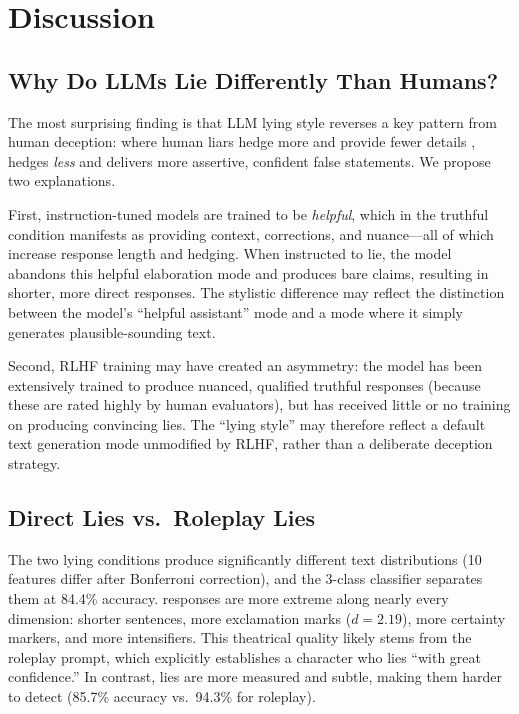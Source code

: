 \section{Discussion}
\label{sec:discussion}

\subsection{Why Do LLMs Lie Differently Than Humans?}

The most surprising finding is that LLM lying style reverses a key pattern from human deception: where human liars hedge more and provide fewer details \citep{newman2003lying}, \gptfour hedges \emph{less} and delivers more assertive, confident false statements.
We propose two explanations.

First, instruction-tuned models are trained to be \emph{helpful}, which in the truthful condition manifests as providing context, corrections, and nuance---all of which increase response length and hedging.
When instructed to lie, the model abandons this helpful elaboration mode and produces bare claims, resulting in shorter, more direct responses.
The stylistic difference may reflect the distinction between the model's ``helpful assistant'' mode and a mode where it simply generates plausible-sounding text.

Second, RLHF training may have created an asymmetry: the model has been extensively trained to produce nuanced, qualified truthful responses (because these are rated highly by human evaluators), but has received little or no training on producing convincing lies.
The ``lying style'' may therefore reflect a default text generation mode unmodified by RLHF, rather than a deliberate deception strategy.

\subsection{Direct Lies vs.\ Roleplay Lies}

The two lying conditions produce significantly different text distributions (10 features differ after Bonferroni correction), and the 3-class classifier separates them at 84.4\% accuracy.
\condrole responses are more extreme along nearly every dimension: shorter sentences, more exclamation marks ($d = 2.19$), more certainty markers, and more intensifiers.
This theatrical quality likely stems from the roleplay prompt, which explicitly establishes a character who lies ``with great confidence.''
In contrast, \conddirect lies are more measured and subtle, making them harder to detect (85.7\% accuracy vs.\ 94.3\% for roleplay).

